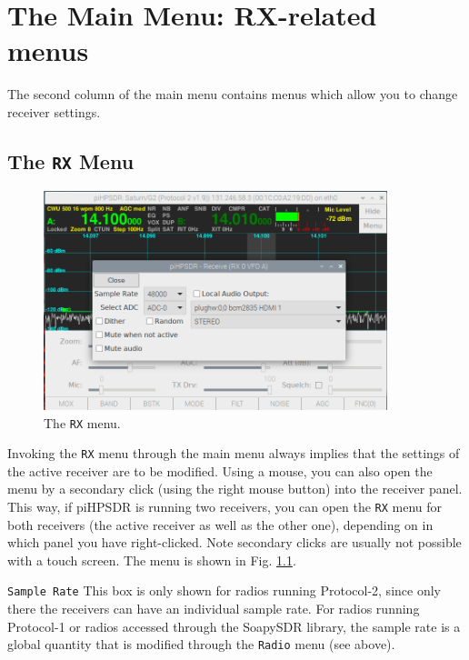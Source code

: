 \documentclass[12pt]{book}
\def\rett#1{\texttt{\color{red}#1}}
\def\bltt#1{\texttt{\color{blue}#1}}
\def\pH{pi\-HPSDR }
\begin{document}
\chapter[RX-related menus]{The Main Menu: RX-related menus}

The second column of the main menu contains menus which allow you to change
receiver settings.

\section{The \texttt{RX} Menu}

\begin{figure}[ht!]
\center
\includegraphics[width=10cm]{RXMenu.png}
\caption{The \bltt{RX} menu.}
\label{fig:RXMenu}
\end{figure}

Invoking the \bltt{RX} menu through the main menu always implies that the settings
of the active receiver are to be modified. Using a mouse, you can also open the menu
by a secondary click (using the right mouse button) into the receiver panel. This way,
if \pH is running two receivers, you can open the \bltt{RX} menu for both receivers
(the active receiver as well as the other one), depending on in which panel you have
right-clicked. Note secondary clicks are usually not possible with a touch screen.
The menu is shown in Fig. \ref{fig:RXMenu}.

\rett{Sample Rate} This box is only shown for radios running Protocol-2, since only there the
receivers can have an individual sample rate. For radios running Protocol-1 or radios accessed
through the SoapySDR library, the sample rate is a global quantity that is modified
through the \bltt{Radio} menu (see above).
\end{document}
